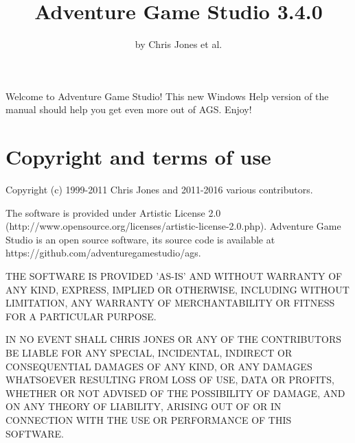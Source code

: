 %
%
\newcommand{\commandref}[2]{\helpref{{\tt $\backslash$#1}}{#2}}%
\newcommand{\commandrefn}[2]{\helprefn{{\tt $\backslash$#1}}{#2}\index{#1}}%
\newcommand{\commandpageref}[2]{\latexignore{\helprefn{{\tt $\backslash$#1}}{#2}}\latexonly{{\tt $\backslash$#1} {\it page \pageref{#2}}}\index{#1}}%
\newcommand{\indexit}[1]{#1\index{#1}}%
\newcommand{\inioption}[1]{{\bf {\tt #1}}\index{#1}}%
\parskip=10pt%
\parindent=0pt%
\title{Adventure Game Studio 3.4.0}%
\author{by Chris Jones et al.}%
\makeindex%
%

\maketitle%
\pagestyle{fancyplain}%
%
%
%
\setfooter{\thepage}{}{}{}{}{\thepage}%

Welcome to Adventure Game Studio! This new Windows Help version of the manual should
help you get even more out of AGS. Enjoy!

\tableofcontents%

\chapter*{Copyright and terms of use}%
%
\setfooter{\thepage}{}{}{}{}{\thepage}%

Copyright (c) 1999-2011 Chris Jones and 2011-2016 various contributors.

The software is provided under Artistic License 2.0 (http://www.opensource.org/licenses/artistic-license-2.0.php).
Adventure Game Studio is an open source software, its source code is available at https://github.com/adventuregamestudio/ags.

THE SOFTWARE IS PROVIDED 'AS-IS' AND WITHOUT WARRANTY OF ANY KIND, EXPRESS,
IMPLIED OR OTHERWISE, INCLUDING WITHOUT LIMITATION, ANY WARRANTY OF
MERCHANTABILITY OR FITNESS FOR A PARTICULAR PURPOSE.

IN NO EVENT SHALL CHRIS JONES OR ANY OF THE CONTRIBUTORS BE LIABLE FOR ANY
SPECIAL, INCIDENTAL, INDIRECT OR CONSEQUENTIAL DAMAGES OF ANY KIND, OR ANY
DAMAGES WHATSOEVER RESULTING FROM LOSS OF USE, DATA OR PROFITS, WHETHER OR
NOT ADVISED OF THE POSSIBILITY OF DAMAGE, AND ON ANY THEORY OF LIABILITY,
ARISING OUT OF OR IN CONNECTION WITH THE USE OR PERFORMANCE OF THIS SOFTWARE.

